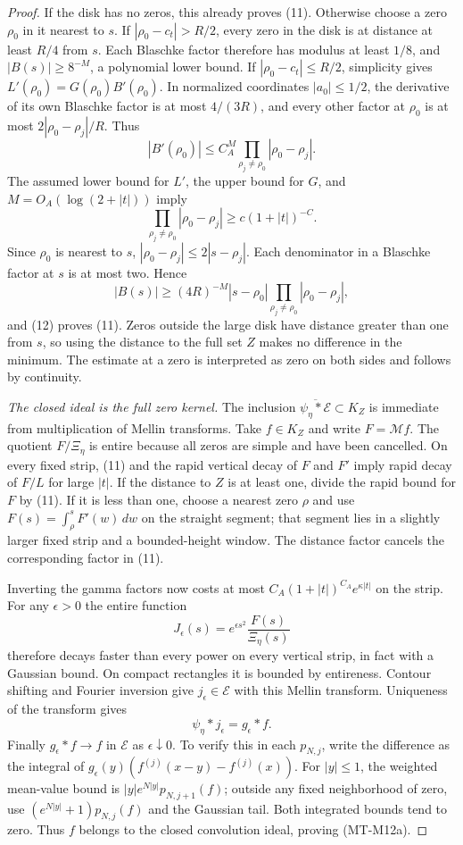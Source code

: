\begin{proof}
If the disk has no zeros, this already proves (11).
Otherwise choose a zero $\rho_0$ in it nearest to $s$.
If $|\rho_0-c_t|>R/2$, every zero in the disk is at
distance at least $R/4$ from $s$. Each Blaschke factor
therefore has modulus at least $1/8$, and
$|B(s)|\ge8^{-M}$, a polynomial lower bound.
If $|\rho_0-c_t|\le R/2$, simplicity gives
$L'(\rho_0)=G(\rho_0)B'(\rho_0)$.
In normalized coordinates $|a_0|\le1/2$, the derivative
of its own Blaschke factor is at most $4/(3R)$, and
every other factor at $\rho_0$ is at most
$2|\rho_0-\rho_j|/R$. Thus
\[
 |B'(\rho_0)|\le C_A^M
                     \prod_{\rho_j\ne\rho_0}|\rho_0-\rho_j|.
\]
The assumed lower bound for $L'$, the upper bound for $G$,
and $M=O_A(\log(2+|t|))$ imply
\[
          \prod_{\rho_j\ne\rho_0}|\rho_0-\rho_j|
                          \ge c(1+|t|)^{-C}.           \tag{12}
\]
Since $\rho_0$ is nearest to $s$,
$|\rho_0-\rho_j|\le2|s-\rho_j|$. Each denominator in a
Blaschke factor at $s$ is at most two. Hence
\[
 |B(s)|\ge(4R)^{-M}|s-\rho_0|
                       \prod_{\rho_j\ne\rho_0}|\rho_0-\rho_j|,
\]
and (12) proves (11). Zeros outside the large disk have
distance greater than one from $s$, so using the distance
to the full set $Z$ makes no difference in the minimum.
The estimate at a zero is interpreted as zero on both
sides and follows by continuity.

\emph{The closed ideal is the full zero kernel.}
The inclusion
$\overline{\psi_\eta*\mathcal E}\subset K_Z$ is immediate
from multiplication of Mellin transforms.
Take $f\in K_Z$ and write $F=\mathcal Mf$.
The quotient $F/\Xi_\eta$ is entire because all zeros
are simple and have been cancelled. On every fixed strip,
(11) and the rapid vertical decay of $F$ and $F'$ imply
rapid decay of $F/L$ for large $|t|$. If the distance to
$Z$ is at least one, divide the rapid bound for $F$
by (11). If it is less than one, choose a nearest zero
$\rho$ and use
$F(s)=\int_\rho^s F'(w)\,dw$ on the straight segment;
that segment lies in a slightly larger fixed strip and
a bounded-height window. The distance factor cancels
the corresponding factor in (11).

Inverting the gamma factors now costs at most
$C_A(1+|t|)^{C_A}e^{\kappa|t|}$ on the strip.
For any $\epsilon>0$ the entire function
\[
             J_\epsilon(s)=e^{\epsilon s^2}
                                  \frac{F(s)}{\Xi_\eta(s)}
\]
therefore decays faster than every power on every vertical
strip, in fact with a Gaussian bound. On compact rectangles
it is bounded by entireness. Contour shifting and Fourier
inversion give $j_\epsilon\in\mathcal E$ with this Mellin
transform. Uniqueness of the transform gives
\[
                  \psi_\eta*j_\epsilon=g_\epsilon*f.
\]
Finally $g_\epsilon*f\to f$ in $\mathcal E$ as
$\epsilon\downarrow0$. To verify this in each $p_{N,j}$,
write the difference as the integral of
$g_\epsilon(y)(f^{(j)}(x-y)-f^{(j)}(x))$.
For $|y|\le1$, the weighted mean-value bound is
$|y|e^{N|y|}p_{N,j+1}(f)$; outside any fixed
neighborhood of zero, use
$(e^{N|y|}+1)p_{N,j}(f)$ and the Gaussian tail.
Both integrated bounds tend to zero.
Thus $f$ belongs to the closed convolution ideal,
proving (MT-M12a).


\end{proof}
